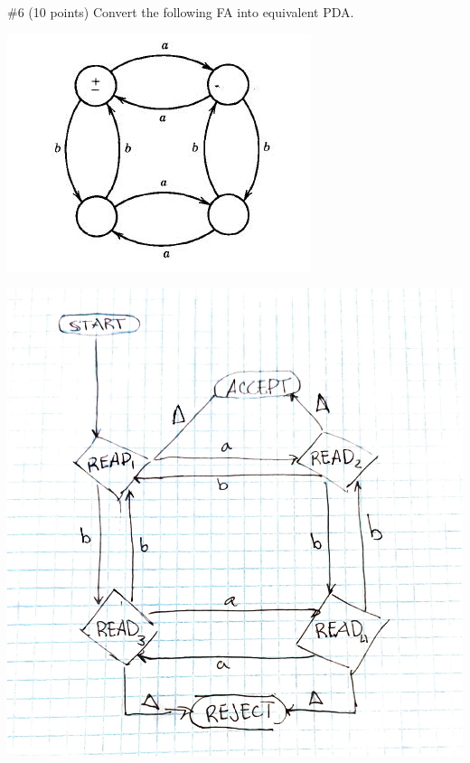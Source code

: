 \begin{problem}{\#6 (10 points)}
    Convert the following FA into equivalent PDA.
    \begin{center}
        \includegraphics[]{figures/question6.jpg}
    \end{center}
\end{problem}
\begin{solution}
    \begin{center}
        \includegraphics[width=\linewidth]{figures/answer.pdf}
    \end{center}
\end{solution}

